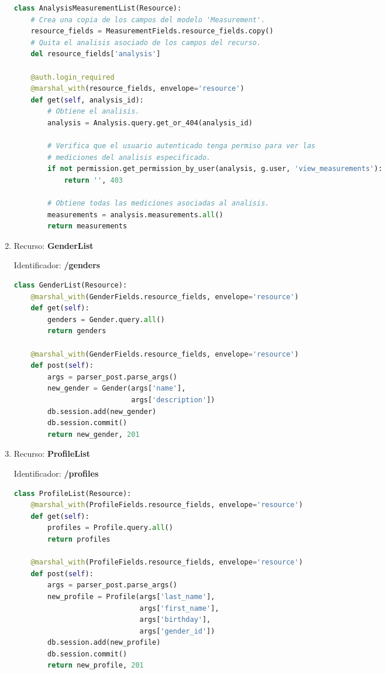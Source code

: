 \begin{enumerate}
\begin{lstlisting}[language=Python]
class AnalysisMeasurementList(Resource):
    # Crea una copia de los campos del modelo 'Measurement'.
    resource_fields = MeasurementFields.resource_fields.copy()
    # Quita el analisis asociado de los campos del recurso.
    del resource_fields['analysis']
    
    @auth.login_required
    @marshal_with(resource_fields, envelope='resource')
    def get(self, analysis_id):
        # Obtiene el analisis.
        analysis = Analysis.query.get_or_404(analysis_id)

        # Verifica que el usuario autenticado tenga permiso para ver las
        # mediciones del analisis especificado.
        if not permission.get_permission_by_user(analysis, g.user, 'view_measurements'):
            return '', 403

        # Obtiene todas las mediciones asociadas al analisis.
        measurements = analysis.measurements.all()
        return measurements
\end{lstlisting}

\item Recurso: \textbf{GenderList}

Identificador: \textbf{/genders}

\begin{lstlisting}[language=Python]
class GenderList(Resource):
    @marshal_with(GenderFields.resource_fields, envelope='resource')
    def get(self):
        genders = Gender.query.all()
        return genders

    @marshal_with(GenderFields.resource_fields, envelope='resource')
    def post(self):
        args = parser_post.parse_args()
        new_gender = Gender(args['name'],
                            args['description'])
        db.session.add(new_gender)
        db.session.commit()
        return new_gender, 201
\end{lstlisting}

\item Recurso: \textbf{ProfileList}

Identificador: \textbf{/profiles}

\begin{lstlisting}[language=Python]
class ProfileList(Resource):
    @marshal_with(ProfileFields.resource_fields, envelope='resource')
    def get(self):
        profiles = Profile.query.all()
        return profiles

    @marshal_with(ProfileFields.resource_fields, envelope='resource')
    def post(self):
        args = parser_post.parse_args()
        new_profile = Profile(args['last_name'],
                              args['first_name'],
                              args['birthday'],
                              args['gender_id'])
        db.session.add(new_profile)
        db.session.commit()
        return new_profile, 201
\end{lstlisting}


\end{enumerate}
